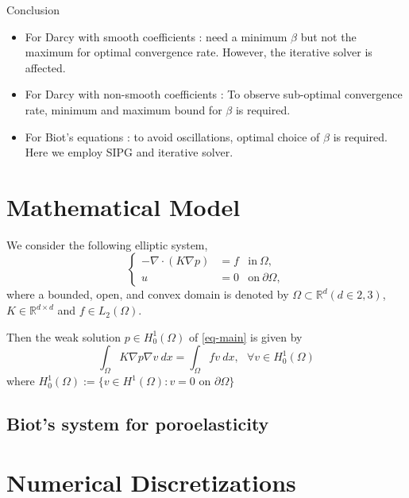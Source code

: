 \documentclass{article}
\begin{document}
Conclusion
\begin{itemize}
\item For Darcy with smooth coefficients : need a minimum $\beta$ but not the maximum for optimal convergence rate. However, the iterative solver is affected.
\item For Darcy with non-smooth coefficients : To observe sub-optimal convergence rate, minimum and maximum bound for $\beta$ is required. 
\item For Biot's equations : to avoid oscillations, optimal choice of $\beta$ is required. Here we employ SIPG and iterative solver. 
\end{itemize}

\section{Mathematical Model}
We consider the following elliptic system,  
\begin{equation}\label{eq-main}
\left\{ 
\begin{array}{rll} 
-\nabla \cdot (K \nabla p)
&=  f
& \textrm{in}~\Omega, \\
u&=0& \textrm{on}~\partial \Omega,
\end{array}
\right.
\end{equation}
where a bounded, open, and convex domain is denoted by 
$\Omega \subset \mathbb{R}^d (d \in {2,3})$, $K\in \mathbb{R}^{d\times d}$ and $f \in L_2(\Omega)$.

Then the weak solution $p \in H_0^{1}(\Omega)$ 
of \eqref{eq-main} is given by 
\begin{equation}
\int_\Omega K \nabla p \nabla v \ dx = 
\int_\Omega f  v \ dx, \ \ \ \forall v \in H_0^1(\Omega)
\label{eq-weak}
\end{equation}
where $H_0^1(\Omega):= \{  v \in H^1(\Omega): v = 0 \text{ on } \partial \Omega \}$

\subsection{Biot's system for poroelasticity}

\section{Numerical Discretizations}
\end{document}

